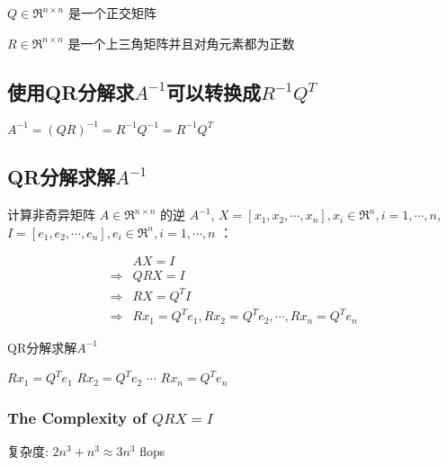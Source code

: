 \begin{corollary}
    $ Q \in \mathfrak{R}^{n \times n} $ 是一个正交矩阵
\end{corollary}

\begin{corollary}
    $ R \in \mathfrak{R}^{n \times n} $ 是一个上三角矩阵并且对角元素都为正数
\end{corollary}


\subsection{使用QR分解求$A^{-1}$可以转换成$R^{-1} Q^{T}$}

\begin{theorem}
    $ A^{-1}=(Q R)^{-1}=R^{-1} Q^{-1}=R^{-1} Q^{T} $
\end{theorem}

\subsection{QR分解求解$A^{-1}$}


计算非奇异矩阵 $  {A} \in \mathfrak{R}^{n \times n} $ 的逆 $  {A}^{-1} $, $X=\left[x_{1}, x_{2}, \cdots, x_{n}\right], x_{i} \in \mathfrak{R}^{n}, i=1, \cdots, n$,$I=\left[e_{1}, e_{2}, \cdots, e_{n}\right], e_{i} \in \mathfrak{R}^{n}, i=1, \cdots, n$
：


\begin{equation}\begin{aligned}
    &AX = I \\
    \Rightarrow&   Q R X=I \\
    \Rightarrow&   R X =Q^{T} I \\
    \Rightarrow&  R x_{1}= Q^{T} e_{1}, R x_{2}=Q^{T} e_{2}, \cdots, R x_{n}=Q^{T} e_{n}
\end{aligned}\end{equation}

\begin{algorithm}[htbp]
    \caption{QR分解求解$A^{-1}$}
    $R x_{1}= Q^{T} e_{1}$\;
    $R x_{2}=Q^{T} e_{2}$\;
    $\cdots$\;
    $R x_{n}=Q^{T} e_{n}$\;
\end{algorithm}

\subsubsection{The Complexity of $ Q R X=I $}
\label{complexity:QRX-eqs-I}

复杂度: $ 2 n^{3}+n^{3} \approx 3 n^{3} $ flops

